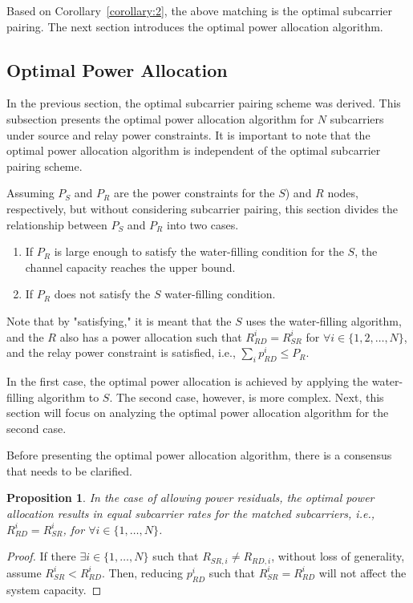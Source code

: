 \documentclass[lettersize,journal]{IEEEtran}
\newtheorem{proposition}{Proposition}
\begin{document}
	Based on Corollary~\ref{corollary:2}, the above matching is the optimal subcarrier pairing. The next section introduces the optimal power allocation algorithm.
	\subsection{Optimal Power Allocation}
	
	In the previous section, the optimal subcarrier pairing scheme was derived. This subsection presents the optimal power allocation algorithm for \( N \) subcarriers under source and relay power constraints. It is important to note that the optimal power allocation algorithm is independent of the optimal subcarrier pairing scheme.
	
	Assuming \( P_S \) and \( P_R \) are the power constraints for the \(S\)) and \(R\) nodes, respectively, but without considering subcarrier pairing, this section divides the relationship between \( P_S \) and \( P_R \) into two cases.
	\begin{enumerate}
		\item If \( P_R \) is large enough to satisfy the water-filling condition for the \(S\), the channel capacity reaches the upper bound.
		\item If \( P_R \) does not satisfy the \(S\) water-filling condition.
	\end{enumerate}
	Note that by "satisfying," it is meant that the \(S\) uses the water-filling algorithm, and the \(R\) also has a power allocation such that \( R_{RD}^{i} = R_{SR}^{i} \) for \( \forall i \in \{1, 2, \dots, N\} \), and the relay power constraint is satisfied, i.e., \( \sum_{i} p_{RD}^i \leq P_R \).
	
	In the first case, the optimal power allocation is achieved by applying the water-filling algorithm to \(S\). The second case, however, is more complex. Next, this section will focus on analyzing the optimal power allocation algorithm for the second case.
	
	Before presenting the optimal power allocation algorithm, there is a consensus that needs to be clarified.
	\begin{proposition}
		In the case of allowing power residuals, the optimal power allocation results in equal subcarrier rates for the matched subcarriers, i.e., \( R_{RD}^{i} = R_{SR}^{i} \), for \( \forall i \in \{1, \dots, N\} \).
	\end{proposition}
	\begin{proof}
		If there \( \exists i \in \{1, \dots, N\} \)  such that \( R_{SR,i} \neq R_{RD,i} \), without loss of generality, assume \( R_{SR}^i < R_{RD}^i \). Then, reducing \( p_{RD}^i \) such that \( R_{SR}^i = R_{RD}^i \) will not affect the system capacity.
	\end{proof}
	
\end{document}
